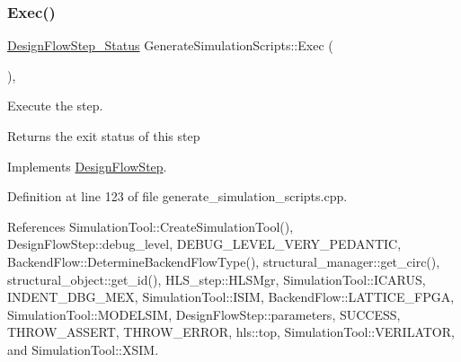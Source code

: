 \subsubsection{\texorpdfstring{Exec()}{Exec()}}
{\footnotesize\ttfamily \hyperlink{design__flow__step_8hpp_afb1f0d73069c26076b8d31dbc8ebecdf}{Design\+Flow\+Step\+\_\+\+Status} Generate\+Simulation\+Scripts\+::\+Exec (\begin{DoxyParamCaption}{ }\end{DoxyParamCaption})\hspace{0.3cm}{\ttfamily [override]}, {\ttfamily [virtual]}}



Execute the step. 

\begin{DoxyReturn}{Returns}
the exit status of this step 
\end{DoxyReturn}


Implements \hyperlink{classDesignFlowStep_a77d7e38493016766098711ea24f60b89}{Design\+Flow\+Step}.



Definition at line 123 of file generate\+\_\+simulation\+\_\+scripts.\+cpp.



References Simulation\+Tool\+::\+Create\+Simulation\+Tool(), Design\+Flow\+Step\+::debug\+\_\+level, D\+E\+B\+U\+G\+\_\+\+L\+E\+V\+E\+L\+\_\+\+V\+E\+R\+Y\+\_\+\+P\+E\+D\+A\+N\+T\+IC, Backend\+Flow\+::\+Determine\+Backend\+Flow\+Type(), structural\+\_\+manager\+::get\+\_\+circ(), structural\+\_\+object\+::get\+\_\+id(), H\+L\+S\+\_\+step\+::\+H\+L\+S\+Mgr, Simulation\+Tool\+::\+I\+C\+A\+R\+US, I\+N\+D\+E\+N\+T\+\_\+\+D\+B\+G\+\_\+\+M\+EX, Simulation\+Tool\+::\+I\+S\+IM, Backend\+Flow\+::\+L\+A\+T\+T\+I\+C\+E\+\_\+\+F\+P\+GA, Simulation\+Tool\+::\+M\+O\+D\+E\+L\+S\+IM, Design\+Flow\+Step\+::parameters, S\+U\+C\+C\+E\+SS, T\+H\+R\+O\+W\+\_\+\+A\+S\+S\+E\+RT, T\+H\+R\+O\+W\+\_\+\+E\+R\+R\+OR, hls\+::top, Simulation\+Tool\+::\+V\+E\+R\+I\+L\+A\+T\+OR, and Simulation\+Tool\+::\+X\+S\+IM.

